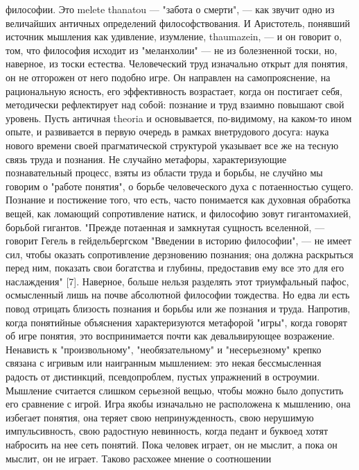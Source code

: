 \documentclass[12pt]{article}
\begin{document}
философии. Это melete thanatou --- "забота о смерти", --- как звучит одно из величайших античных определений
философствования. И Аристотель, понявший источник мышления как удивление, изумление, thaumazein, --- и он
говорит о, том, что философия исходит из "меланхолии" --- не из болезненной тоски, но, наверное, из тоски
естества.  Человеческий  труд  изначально  открыт  для  понятия,  он  не  отгорожен  от  него  подобно  игре.  Он
направлен на самопрояснение, на рациональную ясность, его эффективность возрастает, когда он постигает
себя, методически рефлектирует над собой: познание и труд взаимно повышают свой уровень. Пусть античная
theoria  и  основывается,  по-видимому,  на  каком-то  ином  опыте,  и  развивается  в  первую  очередь  в  рамках
внетрудового досуга: наука нового времени своей прагматической структурой указывает все же на тесную связь
труда и познания. Не случайно метафоры, характеризующие познавательный процесс, взяты из области труда и
борьбы, не случйно мы говорим о "работе понятия", о борьбе человеческого духа с потаенностью сущего.
Познание  и  постижение  того,  что  есть,  часто  понимается  как  духовная  обработка  вещей,  как  ломающий
сопротивление натиск, и философию зовут гигантомахией, борьбой гигантов. "Прежде потаенная и замкнутая
сущность вселенной, --- говорит Гегель в гейдельбергском "Введении в историю философии", --- не имеет сил,
чтобы  оказать  сопротивление  дерзновению  познания;  она  должна  раскрыться  перед  ним,  показать  свои
богатства и глубины, предоставив ему все это для его наслаждения" [7]. Наверное, больше нельзя разделять этот
триумфальный пафос, осмысленный лишь на почве абсолютной философии тождества. Но едва ли есть повод
отрицать  близость  познания  и борьбы  или  же  познания  и труда.  Напротив,  когда  понятийные объяснения
характеризуются  метафорой  "игры",  когда  говорят  об  игре  понятия,  это  воспринимается  почти  как 
девальвирующее  возражение.  Ненависть  к  "произвольному",  "необязательному"  и  "несерьезному"  крепко
связана  с  игривым  или  наигранным  мышлением:  это  некая  бессмысленная  радость  от  дистинкций,
псевдопроблем,  пустых  упражнений  в  остроумии.  Мышление  считается  слишком  серьезной  вещью,  чтобы
можно было  допустить его  сравнение  с  игрой. Игра якобы изначально не  расположена  к  мышлению,  она
избегает понятия, она теряет свою непринужденность, свою нерушимую импульсивность, свою радостную
невинность, когда педант и буквоед хотят набросить на нее сеть понятий.
Пока человек играет, он не мыслит, а пока он мыслит, он не играет. Таково расхожее мнение о соотношении
\end{document}
